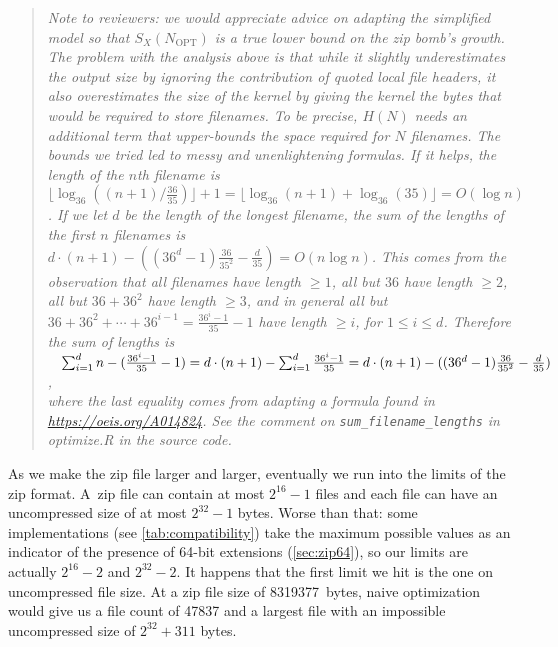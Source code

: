 \documentclass[letterpaper,twocolumn,10pt]{article}
\newcommand{\OPT}{\mathrm{OPT}}
\begin{document}
\begin{quote}
\sl
Note to reviewers:
we would appreciate advice
on adapting the simplified model
so that $S_X(N_\OPT)$ is
a true lower bound on the zip bomb's growth.
The problem with the analysis above is that while it slightly underestimates
the output size by ignoring the contribution of quoted local file headers,
it also overestimates the size of the kernel
by giving the kernel the bytes that would be required to store filenames.
To be precise, $H(N)$ needs an additional term
that upper-bounds the space required for $N$ filenames.
The bounds we tried led to messy and unenlightening formulas.
If it helps, the length of the $n$\/th filename is
$\lfloor \log_{36}((n + 1) / \frac{36}{35})\rfloor + 1 =
\lfloor \log_{36}(n + 1) + \log_{36}(35)\rfloor = O(\log n)$.
If we let $d$ be the length of the longest filename,
the sum of the lengths of the first $n$ filenames is
$d\cdot(n+1) - ((36^d - 1) \frac{36}{35^2} - \frac{d}{35}) = O(n\log n)$.
This comes from the observation that all filenames have length $\ge 1$,
all but $36$ have length $\ge 2$,
all but $36+36^2$ have length $\ge 3$, and in general
all but $36+36^2+\cdots+36^{i-1} = \frac{36^i-1}{35}-1$ have length $\ge i$,
for $1 \le i \le d$.
Therefore the sum of lengths is \\
$\phantom{=}\sum_{i=1}^d n - (\frac{36^i-1}{35}-1) \\
= d\cdot(n+1) - \sum_{i=1}^d \frac{36^i-1}{35} \\
= d\cdot(n+1) - ((36^d - 1)\frac{36}{35^2} - \frac{d}{35})$,\\
where the last equality comes from adapting a formula found in
\url{https://oeis.org/A014824}.
See the comment on \texttt{sum\_filename\_lengths}
in \mbox{optimize.R} in the source code.
\end{quote}

As we make the zip file larger and larger,
eventually we run into the limits of the zip format.
A~zip file can contain at most $2^{16}-1$ files
and each file can have an uncompressed size of at most $2^{32}-1$ bytes.
Worse than that:
some implementations (see \autoref{tab:compatibility})
take the maximum possible values
as an indicator of the presence of 64-bit extensions (\autoref{sec:zip64}),
so our limits are actually $2^{16}-2$ and $2^{32}-2$.
It happens that the first limit we hit is the one on uncompressed file size.
At a zip file size of \SI{8319377}{bytes},
naive optimization would give us a file count of \num{47837}
and a largest file with an impossible uncompressed size of
$2^{32}+311$ bytes.
% 
% 
\end{document}
